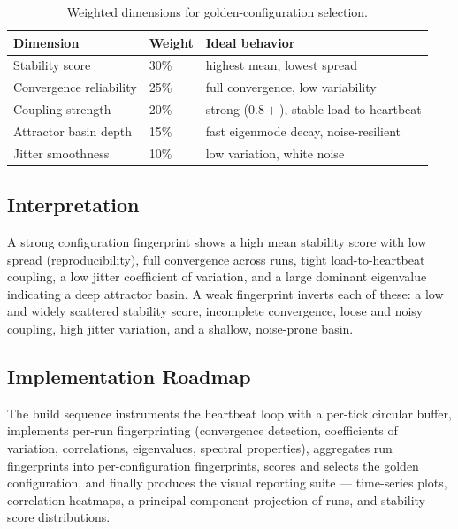 \begin{table}[h]
\centering
\begin{tabular}{lll}
\toprule
Dimension & Weight & Ideal behavior \\
\midrule
Stability score          & 30\% & highest mean, lowest spread \\
Convergence reliability  & 25\% & full convergence, low variability \\
Coupling strength        & 20\% & strong ($0.8+$), stable load-to-heartbeat \\
Attractor basin depth    & 15\% & fast eigenmode decay, noise-resilient \\
Jitter smoothness        & 10\% & low variation, white noise \\
\bottomrule
\end{tabular}
\caption{Weighted dimensions for golden-configuration selection.}
\end{table}

\subsection{Interpretation}

A strong configuration fingerprint shows a high mean stability score with low
spread (reproducibility), full convergence across runs, tight load-to-heartbeat
coupling, a low jitter coefficient of variation, and a large dominant eigenvalue
indicating a deep attractor basin. A weak fingerprint inverts each of these: a low
and widely scattered stability score, incomplete convergence, loose and noisy
coupling, high jitter variation, and a shallow, noise-prone basin.

\subsection{Implementation Roadmap}

The build sequence instruments the heartbeat loop with a per-tick circular
buffer, implements per-run fingerprinting (convergence detection, coefficients of
variation, correlations, eigenvalues, spectral properties), aggregates run
fingerprints into per-configuration fingerprints, scores and selects the golden
configuration, and finally produces the visual reporting suite --- time-series
plots, correlation heatmaps, a principal-component projection of runs, and
stability-score distributions.


